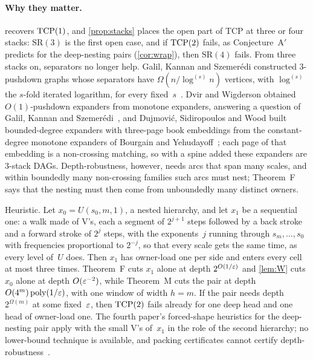 \paragraph{Why they matter.}  recovers $\mathrm{TCP}(1)$, and \cref{prop:stacks} places the open part of TCP at
three or four stacks: $\mathrm{SR}(3)$ is the first open case, and if $\mathrm{TCP}(2)$ fails, as Conjecture~A$'$ predicts for the deep-nesting pairs
(\cref{cor:wrap}), then $\mathrm{SR}(4)$ fails. From three stacks on, separators no longer help.
Galil, Kannan and Szemerédi constructed $3$-pushdown graphs whose separators have $\Omega(n/\log^{(s)}n)$ vertices, with
$\log^{(s)}$ the $s$-fold iterated logarithm, for every fixed~$s$~\cite{GKS1989pushdown}. Dvir and Wigderson obtained
$O(1)$-pushdown expanders from monotone expanders, answering a question of Galil, Kannan and
Szemerédi~\cite{DvirWigderson2010}, and Dujmović, Sidiropoulos and Wood built bounded-degree expanders with three-page book
embeddings from the constant-degree monotone expanders of Bourgain and Yehudayoff~\cite{DSW2016,BourgainYehudayoff2013};
each page of that embedding is a non-crossing matching, so with a spine added these expanders are $3$-stack DAGs.
Depth-robustness, however, needs arcs that span many scales, and within
boundedly many non-crossing families such arcs must nest; Theorem~F says that the nesting must then come from unboundedly
many distinct owners.

\begin{remark}\label{rem:umix-candidate}
Heuristic. Let $x_0=U(s_0,m,1)$, a nested hierarchy, and let $x_1$ be a sequential one: a walk made of V's, each a
segment of $2^{j+1}$ steps followed by a back stroke and a forward stroke of $2^j$ steps, with the exponents~$j$ running
through $s_m,\dots,s_0$ with frequencies proportional to $2^{-j}$, so that every scale gets the same time, as every level
of~$U$ does. Then $x_1$ has owner-load one per side and enters every cell at most three times. Theorem~F cuts $x_1$ alone
at depth $2^{O(1/\varepsilon)}$ and \cref{lem:W} cuts $x_0$ alone at depth $O(\varepsilon^{-2})$, while Theorem~M cuts the pair at depth
$O(4^m)\operatorname{poly}(1/\varepsilon)$, with one window of width $h=m$. If the pair needs depth $2^{\Omega(m)}$ at some fixed~$\varepsilon$, then
$\mathrm{TCP}(2)$ fails already for one deep head and one head of owner-load one. The fourth paper's forced-shape heuristics for the
deep-nesting pair apply with the small V's of~$x_1$ in the role of the second hierarchy; no lower-bound technique is
available, and packing certificates cannot certify depth-robustness~\cite[Proposition~5.14]{FourthPaper2026}.
\end{remark}
